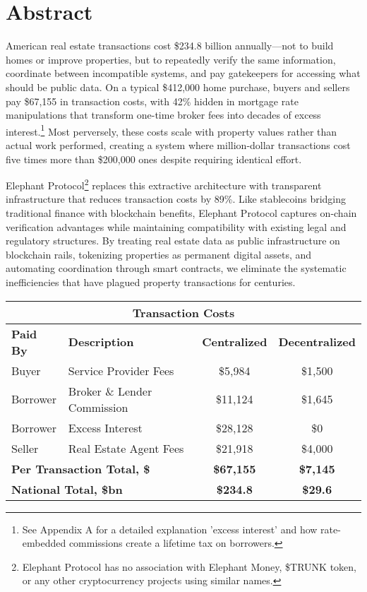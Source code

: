 \chapter{Abstract}

American real estate transactions cost \$234.8 billion annually---not to build homes or improve properties, but to repeatedly verify the same information, coordinate between incompatible systems, and pay gatekeepers for accessing what should be public data. On a typical \$412,000 home purchase, buyers and sellers pay \$67,155 in transaction costs, with 42\% hidden in mortgage rate manipulations that transform one-time broker fees into decades of excess interest.\footnote{See Appendix A for a detailed explanation 'excess interest' and how rate-embedded commissions create a lifetime tax on borrowers.} Most perversely, these costs scale with property values rather than actual work performed, creating a system where million-dollar transactions cost five times more than \$200,000 ones despite requiring identical effort.

Elephant Protocol\footnote{Elephant Protocol has no association with Elephant Money, \$TRUNK token, or any other cryptocurrency projects using similar names.} replaces this extractive architecture with transparent infrastructure that reduces transaction costs by 89\%. Like stablecoins bridging traditional finance with blockchain benefits, Elephant Protocol captures on-chain verification advantages while maintaining compatibility with existing legal and regulatory structures. By treating real estate data as public infrastructure on blockchain rails, tokenizing properties as permanent digital assets, and automating coordination through smart contracts, we eliminate the systematic inefficiencies that have plagued property transactions for centuries.

\begin{center}
\begin{tabular}{llcc}
\hline
\multicolumn{4}{c}{\textbf{Transaction Costs}} \\
\hline
\textbf{Paid By} & \textbf{Description} & \textbf{Centralized} & \textbf{Decentralized} \\
\hline
Buyer & Service Provider Fees & \$5,984 & \$1,500 \\
Borrower & Broker \& Lender Commission & \$11,124 & \$1,645 \\
Borrower & Excess Interest & \$28,128 & \$0 \\
Seller & Real Estate Agent Fees & \$21,918 & \$4,000 \\
\hline
\multicolumn{2}{l}{\textbf{Per Transaction Total, \$}} & \textbf{\$67,155} & \textbf{\$7,145} \\
\multicolumn{2}{l}{\textbf{National Total, \$bn}} & \textbf{\$234.8} & \textbf{\$29.6} \\
\hline
\end{tabular}
\end{center}

